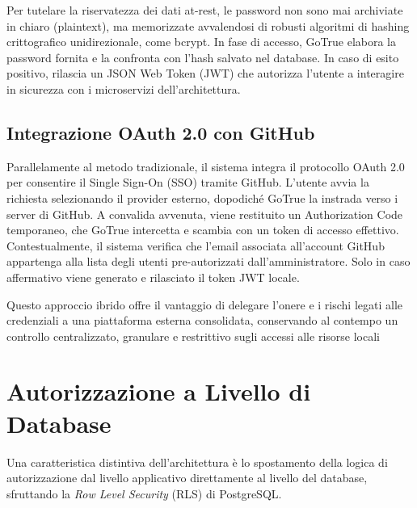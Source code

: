 \documentclass[12pt,a4paper]{report}
\begin{document}
Per tutelare la riservatezza dei dati at-rest, le password non sono
mai archiviate in chiaro (plaintext), ma memorizzate avvalendosi di
robusti algoritmi di hashing crittografico unidirezionale, come
bcrypt. In fase di accesso, GoTrue elabora la password fornita e la
confronta con l'hash salvato nel database. In caso di esito positivo,
rilascia un JSON Web Token (JWT) che autorizza l'utente a interagire
in sicurezza con i microservizi dell'architettura.

\subsection{Integrazione OAuth 2.0 con GitHub}
Parallelamente al metodo tradizionale, il sistema integra il
protocollo OAuth 2.0 per consentire il Single Sign-On (SSO) tramite
GitHub. L'utente avvia la richiesta selezionando il provider esterno,
dopodiché GoTrue la instrada verso i server di GitHub. A convalida
avvenuta, viene restituito un Authorization Code temporaneo, che
GoTrue intercetta e scambia con un token di accesso effettivo.
Contestualmente, il sistema verifica che l'email associata
all'account GitHub appartenga alla lista degli utenti pre-autorizzati
dall'amministratore. Solo in caso affermativo viene generato e
rilasciato il token JWT locale.

Questo approccio ibrido offre il vantaggio di delegare l'onere e i
rischi legati alle credenziali a una piattaforma esterna consolidata,
conservando al contempo un controllo centralizzato, granulare e
restrittivo sugli accessi alle risorse locali

\section{Autorizzazione a Livello di Database}
Una caratteristica distintiva dell'architettura è lo spostamento della logica
di autorizzazione dal livello applicativo direttamente al livello del database,
sfruttando la \textit{Row Level Security} (RLS) di PostgreSQL.
\end{document}
